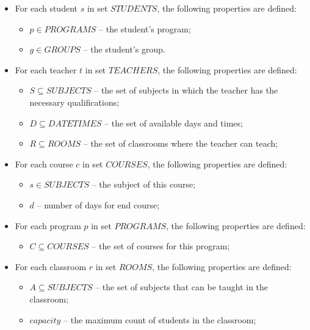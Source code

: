 \documentclass{article}
\begin{document}
\begin{itemize}
    \setlength\itemsep{0.05em}
    \item For each student $s$ in set $STUDENTS$, the following properties are defined:
    \begin{itemize}
        \setlength\itemsep{0.05em}
        \item $p \in PROGRAMS$ -- the student's program;
        \item $g \in GROUPS$ -- the student's group.
    \end{itemize}

    \item For each teacher $t$ in set $TEACHERS$, the following properties are defined:
    \begin{itemize}
        \setlength\itemsep{0.05em}
        \item $S \subseteq SUBJECTS$ -- the set of subjects in which the teacher has the necessary qualifications;
        \item $D \subseteq DATETIMES$ -- the set of available days and times;
        \item $R \subseteq ROOMS$ -- the set of classrooms where the teacher can teach; 
    \end{itemize}

    \item For each course $c$ in set $COURSES$, the following properties are defined:
    \begin{itemize}
        \setlength\itemsep{0.05em}
        \item $s \in SUBJECTS$ -- the subject of this course;
        \item $d$ -- number of days for end course;
    \end{itemize}

    \item For each program $p$ in set $PROGRAMS$, the following properties are defined:
    \begin{itemize}
        \setlength\itemsep{0.05em}
        \item $C \subseteq COURSES$ -- the set of courses for this program;
    \end{itemize}
    
    \item For each classroom $r$ in set $ROOMS$, the following properties are defined:
    \begin{itemize}
        \setlength\itemsep{0.05em}
        \item $A \subseteq SUBJECTS$ -- the set of subjects that can be taught in the classroom;
        \item $capacity$ -- the maximum count of students in the classroom;
    \end{itemize}


\end{itemize}
\end{document}
